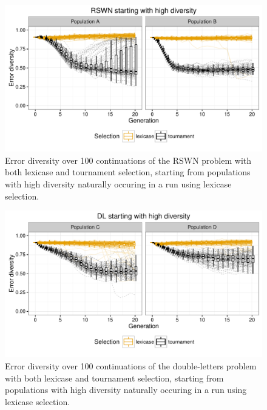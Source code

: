 \documentclass{sig-alternate-05-2015}
\begin{document}
\begin{figure}
	\includegraphics{../figures/RSWN_high_diversity}
	\vspace{-1 cm}
	\caption{Error diversity over 100 continuations of the RSWN problem with both lexicase and tournament selection, starting from populations with high diversity naturally occuring in a run using lexicase selection.}
	\label{fig:RSWNhighDiversity}
\end{figure}

\begin{figure}
	\includegraphics{../figures/DL_high_diversity}
	\vspace{-1 cm}
	\caption{Error diversity over 100 continuations of the double-letters problem with both lexicase and tournament selection, starting from populations with high diversity naturally occuring in a run using lexicase selection.}
	\label{fig:DLhighDiversity}
\end{figure}
\end{document}
